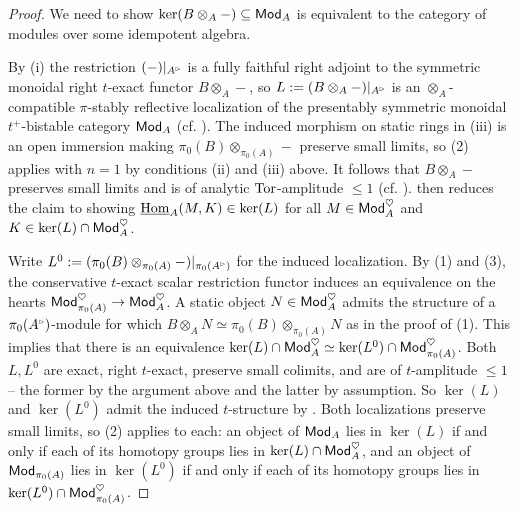 \begin{proof}
    We need to show $\ker(B\otimes_{A}-)\subseteq\mathsf{Mod}_{A}$ is equivalent to the category of modules over some idempotent algebra. 

    By (i) the restriction $(-)|_{A^{\tri}}$ is a fully faithful right adjoint to the symmetric monoidal right $t$-exact functor $B\otimes_{A}-$, so $L:=(B\otimes_{A}-)|_{A^{\tri}}$ is an $\otimes_{A}$-compatible $\pi$-stably reflective localization of the presentably symmetric monoidal $t^{+}$-bistable category $\mathsf{Mod}_{A}$ (cf. ). The induced morphism on static rings in (iii) is an open immersion making $\pi_{0}(B)\otimes_{\pi_{0}(A)}-$ preserve small limits, so  (2) applies with $n=1$ by conditions (ii) and (iii) above. It follows that $B\otimes_{A}-$ preserves small limits and is of analytic $\mathrm{Tor}$-amplitude $\leq 1$ (cf. ).  then reduces the claim to showing $\underline{\mathrm{Hom}}_{A}(M, K)\in\ker(L)$ for all $M\in\mathsf{Mod}_{A}^{\heartsuit}$ and $K\in\ker(L)\cap\mathsf{Mod}_{A}^{\heartsuit}$. 

    Write $L^{0}:=(\pi_{0}(B)\otimes_{\pi_{0}(A)}-)|_{\pi_{0}(A^{\tri})}$ for the induced localization. By  (1) and  (3), the conservative $t$-exact scalar restriction functor induces an equivalence on the hearts $\mathsf{Mod}_{\pi_{0}(A)}^{\heartsuit}\to\mathsf{Mod}_{A}^{\heartsuit}$. A static object $N\in\mathsf{Mod}_{A}^{\heartsuit}$ admits the structure of a $\pi_{0}(A^{\tri})$-module for which $B\otimes_{A}N\simeq\pi_{0}(B)\otimes_{\pi_{0}(A)}N$ as in the proof of  (1). This implies that there is an equivalence $\ker(L)\cap\mathsf{Mod}_{A}^{\heartsuit}\simeq\ker(L^{0})\cap\mathsf{Mod}_{\pi_{0}(A)}^{\heartsuit}$. Both $L, L^{0}$ are exact, right $t$-exact, preserve small colimits, and are of $t$-amplitude $\leq 1$ -- the former by the argument above and the latter by assumption. So $\ker(L)$ and $\ker(L^{0})$ admit the induced $t$-structure by . Both localizations preserve small limits, so  (2) applies to each: an object of $\mathsf{Mod}_{A}$ lies in $\ker(L)$ if and only if each of its homotopy groups lies in $\ker(L)\cap\mathsf{Mod}_{A}^{\heartsuit}$, and an object of $\mathsf{Mod}_{\pi_{0}(A)}$ lies in $\ker(L^{0})$ if and only if each of its homotopy groups lies in $\ker(L^{0})\cap\mathsf{Mod}_{\pi_{0}(A)}^{\heartsuit}$.


\end{proof}
